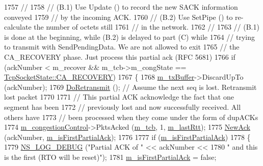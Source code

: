 \begin{DoxyCode}
1757       \textcolor{comment}{//}
1758       \textcolor{comment}{// (B.1) Use Update () to record the new SACK information conveyed}
1759       \textcolor{comment}{//       by the incoming ACK.}
1760       \textcolor{comment}{// (B.2) Use SetPipe () to re-calculate the number of octets still}
1761       \textcolor{comment}{//       in the network.}
1762       \textcolor{comment}{//}
1763       \textcolor{comment}{// (B.1) is done at the beginning, while (B.2) is delayed to part (C) while}
1764       \textcolor{comment}{// trying to transmit with SendPendingData. We are not allowed to exit}
1765       \textcolor{comment}{// the CA\_RECOVERY phase. Just process this partial ack (RFC 5681)}
1766       \textcolor{keywordflow}{if} (ackNumber < m\_recover && m\_tcb->m\_congState == 
      \hyperlink{classns3_1_1TcpSocketState_a6fc313945a33d48fd60cbffe0c787b19a092ee3d215c587170a751974dac5f663}{TcpSocketState::CA\_RECOVERY})
1767         \{
1768           \hyperlink{classns3_1_1TcpSocketBase_a4a1b53982ffd851bd07ab8d5005c130e}{m\_txBuffer}->DiscardUpTo (ackNumber);
1769           \hyperlink{classns3_1_1TcpSocketBase_a13b6b897811a48523988f8af6e9130d3}{DoRetransmit} (); \textcolor{comment}{// Assume the next seq is lost. Retransmit lost packet}
1770 
1771           \textcolor{comment}{// This partial ACK acknowledge the fact that one segment has been}
1772           \textcolor{comment}{// previously lost and now successfully received. All others have}
1773           \textcolor{comment}{// been processed when they come under the form of dupACKs}
1774           \hyperlink{classns3_1_1TcpSocketBase_a090719d52b06a791341e2fefa5e12c3e}{m\_congestionControl}->PktsAcked (\hyperlink{classns3_1_1TcpSocketBase_a26bbaf59001308dc43fb630d76f2e38b}{m\_tcb}, 1, 
      \hyperlink{classns3_1_1TcpSocketBase_a6c48fbea019c593b975bd1d5f5c95dde}{m\_lastRtt});
1775           \hyperlink{classns3_1_1TcpSocketBase_a13401dd51854607d0521a35bf2622761}{NewAck} (ackNumber, \hyperlink{classns3_1_1TcpSocketBase_ad68f7d239e22043ba999101b94770d90}{m\_isFirstPartialAck});
1776 
1777           \textcolor{keywordflow}{if} (\hyperlink{classns3_1_1TcpSocketBase_ad68f7d239e22043ba999101b94770d90}{m\_isFirstPartialAck})
1778             \{
1779               \hyperlink{group__logging_ga413f1886406d49f59a6a0a89b77b4d0a}{NS\_LOG\_DEBUG} (\textcolor{stringliteral}{"Partial ACK of "} << ackNumber <<
1780                             \textcolor{stringliteral}{" and this is the first (RTO will be reset)"});
1781               \hyperlink{classns3_1_1TcpSocketBase_ad68f7d239e22043ba999101b94770d90}{m\_isFirstPartialAck} = \textcolor{keyword}{false};

\end{DoxyCode}
